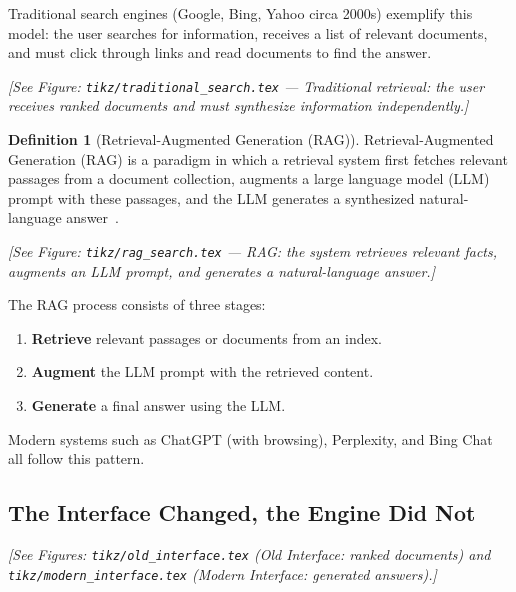 \documentclass[aspectratio=169]{beamer} \usetheme{TUDelft} %
\theoremstyle{definition}
\newtheorem{definition}{Definition}[section]
\theoremstyle{plain}
\begin{document}
Traditional search engines (Google, Bing, Yahoo circa 2000s) exemplify this model: the user searches for information, receives a list of relevant documents, and must click through links and read documents to find the answer.

\begin{center}
\textit{[See Figure: \texttt{tikz/traditional\_search.tex} --- Traditional retrieval: the user receives ranked documents and must synthesize information independently.]}
\end{center}

\begin{definition}[Retrieval-Augmented Generation (RAG)]
\label{def:rag}
Retrieval-Augmented Generation (RAG) is a paradigm in which a retrieval system first fetches relevant passages from a document collection, augments a large language model (LLM) prompt with these passages, and the LLM generates a synthesized natural-language answer~\cite{lewis2020rag}.
\end{definition}

\begin{center}
\textit{[See Figure: \texttt{tikz/rag\_search.tex} --- RAG: the system retrieves relevant facts, augments an LLM prompt, and generates a natural-language answer.]}
\end{center}

The RAG process consists of three stages:
\begin{enumerate}
    \item \textbf{Retrieve} relevant passages or documents from an index.
    \item \textbf{Augment} the LLM prompt with the retrieved content.
    \item \textbf{Generate} a final answer using the LLM.
\end{enumerate}

Modern systems such as ChatGPT (with browsing), Perplexity, and Bing Chat all follow this pattern.

\subsection{The Interface Changed, the Engine Did Not}

\begin{center}
\textit{[See Figures: \texttt{tikz/old\_interface.tex} (Old Interface: ranked documents) and \texttt{tikz/modern\_interface.tex} (Modern Interface: generated answers).]}
\end{center}
\end{document}
